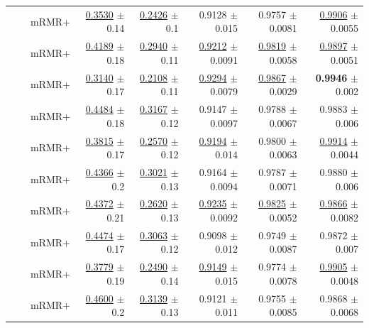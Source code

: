 \begin{longtable}{llp{}rrrrr}
 &  & mRMR+ & \underline{0.3530} {\scriptsize $\pm$ 0.14} & \underline{0.2426} {\scriptsize $\pm$ 0.1} & 0.9128 {\scriptsize $\pm$ 0.015} & 0.9757 {\scriptsize $\pm$ 0.0081} & \underline{0.9906} {\scriptsize $\pm$ 0.0055} \\
 &  & mRMR+ & \underline{0.4189} {\scriptsize $\pm$ 0.18} & \underline{0.2940} {\scriptsize $\pm$ 0.11} & \underline{0.9212} {\scriptsize $\pm$ 0.0091} & \underline{0.9819} {\scriptsize $\pm$ 0.0058} & \underline{0.9897} {\scriptsize $\pm$ 0.0051} \\
 &  & mRMR+ & \underline{0.3140} {\scriptsize $\pm$ 0.17} & \underline{0.2108} {\scriptsize $\pm$ 0.11} & \underline{0.9294} {\scriptsize $\pm$ 0.0079} & \underline{0.9867} {\scriptsize $\pm$ 0.0029} & \textbf{0.9946} {\scriptsize $\pm$ 0.002} \\
 &  & mRMR+ & \underline{0.4484} {\scriptsize $\pm$ 0.18} & \underline{0.3167} {\scriptsize $\pm$ 0.12} & 0.9147 {\scriptsize $\pm$ 0.0097} & 0.9788 {\scriptsize $\pm$ 0.0067} & 0.9883 {\scriptsize $\pm$ 0.006} \\
 &  & mRMR+ & \underline{0.3815} {\scriptsize $\pm$ 0.17} & \underline{0.2570} {\scriptsize $\pm$ 0.12} & \underline{0.9194} {\scriptsize $\pm$ 0.014} & 0.9800 {\scriptsize $\pm$ 0.0063} & \underline{0.9914} {\scriptsize $\pm$ 0.0044} \\
 &  & mRMR+ & \underline{0.4366} {\scriptsize $\pm$ 0.2} & \underline{0.3021} {\scriptsize $\pm$ 0.13} & 0.9164 {\scriptsize $\pm$ 0.0094} & 0.9787 {\scriptsize $\pm$ 0.0071} & 0.9880 {\scriptsize $\pm$ 0.006} \\
 &  & mRMR+ & \underline{0.4372} {\scriptsize $\pm$ 0.21} & \underline{0.2620} {\scriptsize $\pm$ 0.13} & \underline{0.9235} {\scriptsize $\pm$ 0.0092} & \underline{0.9825} {\scriptsize $\pm$ 0.0052} & \underline{0.9866} {\scriptsize $\pm$ 0.0082} \\
 &  & mRMR+ & \underline{0.4474} {\scriptsize $\pm$ 0.17} & \underline{0.3063} {\scriptsize $\pm$ 0.12} & 0.9098 {\scriptsize $\pm$ 0.012} & 0.9749 {\scriptsize $\pm$ 0.0087} & 0.9872 {\scriptsize $\pm$ 0.007} \\
 &  & mRMR+ & \underline{0.3779} {\scriptsize $\pm$ 0.19} & \underline{0.2490} {\scriptsize $\pm$ 0.14} & \underline{0.9149} {\scriptsize $\pm$ 0.015} & 0.9774 {\scriptsize $\pm$ 0.0078} & \underline{0.9905} {\scriptsize $\pm$ 0.0048} \\
 &  & mRMR+ & \underline{0.4600} {\scriptsize $\pm$ 0.2} & \underline{0.3139} {\scriptsize $\pm$ 0.13} & 0.9121 {\scriptsize $\pm$ 0.011} & 0.9755 {\scriptsize $\pm$ 0.0085} & 0.9868 {\scriptsize $\pm$ 0.0068} \\

\end{longtable}

